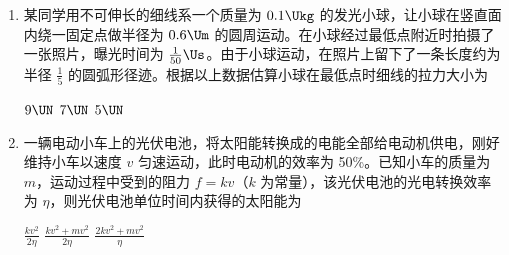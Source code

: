 \documentclass[\gkver]{gaokaozhenti}
\begin{document}
\begin{enumerate}

{条纹间距增大，亮度不变}
{条纹间距减小，亮度减小}
{条纹间距不变，亮度增大}


\item
某同学用不可伸长的细线系一个质量为 $0.1 \Ukg$ 的发光小球，让小球在竖直面内绕一固定点做半径为 $0.6 \Um$ 的圆周运动。在小球经过最低点附近时拍摄了一张照片，曝光时间为 $\frac{1}{50} \Us$。由于小球运动，在照片上留下了一条长度约为半径 $\frac{1}{5}$ 的圆弧形径迹。根据以上数据估算小球在最低点时细线的拉力大小为

\fourchoices[answer=C]
{$11 \UN$}
{$9 \UN$}
{$7 \UN$}
{$5 \UN$}


\item
一辆电动小车上的光伏电池，将太阳能转换成的电能全部给电动机供电，刚好维持小车以速度 $v$ 匀速运动，此时电动机的效率为 50\%。已知小车的质量为 $m$，运动过程中受到的阻力 $f = kv$（$k$ 为常量），该光伏电池的光电转换效率为 $\eta$，则光伏电池单位时间内获得的太阳能为

{$\frac{kv^{2}}{2\eta}$}
{$\frac{kv^{2} + mv^{2}}{2\eta}$}
{$\frac{2kv^{2} + mv^{2}}{\eta}$}


\end{enumerate}
\end{document}
